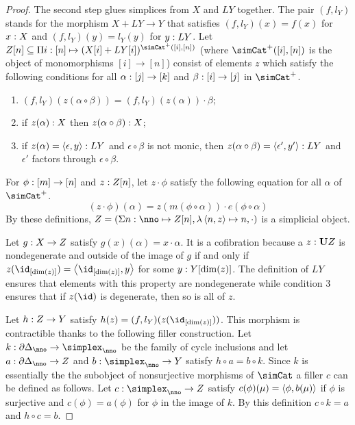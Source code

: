 \documentclass[csh.tex]{subfiles}
\begin{document}
\begin{proof}
The second step glues simplices from $X$ and $LY$ together.
The pair $(f,l_Y)$ stands for the morphism $X+LY\to Y$ that satisfies $(f,l_Y)(x)=f(x)$ for $x: X$ and $(f,l_Y)(y) = l_Y(y)$ for $y: LY$.
Let $Z[n]\subseteq \product{i\of[n]}{(X[i]+LY[i])^{\simCat^+([i],[n])}}$ (where $\simCat^+([i],[n])$ is the object of monomorphisms $[i]\to [n]$) consist of elements $z$ which satisfy the following conditions for all $\alpha: [j]\to [k]$ and $\beta: [i]\to[j]$ in $\simCat^+$.
\begin{enumerate}
\item $(f,l_Y)(z(\alpha\circ\beta)) = (f,l_Y)(z(\alpha))\cdot\beta$;
\item if $z(\alpha): X$ then $z(\alpha\circ\beta): X$;
\item if $z(\alpha)=\left\langle \epsilon,y \right\rangle: LY$ and $\epsilon\circ\beta$ is not monic, then $z(\alpha\circ\beta) = \left\langle \epsilon',y' \right\rangle: LY$ and $\epsilon'$ factors through $\epsilon\circ\beta$.
\end{enumerate}
For $\phi:[m]\to [n]$ and $z: Z[n]$, let $z\cdot\phi$ satisfy the following equation for all $\alpha$ of $\simCat^+$.
\[ (z\cdot\phi)(\alpha) = z(m(\phi\circ\alpha))\cdot e(\phi\circ \alpha) \]
By these definitions, $Z=(\coproduct{n\of\nno}{Z[n]},\function{\tuplet{n,z}}n,\cdot)$ is a simplicial object.

Let $g: X\to Z$ satisfy $g(x)(\alpha) = x\cdot\alpha$. It is a cofibration because a $z:\mathbf{U} Z$ is nondegenerate and outside of the image of $g$ if and only if $z(\id_{[\dim(z)]}) = \tuplet{\id_{[\dim(z)]},y}$ for some $y: Y[\dim(z)]$. The definition of $LY$ ensures that elements with this property are nondegenerate while condition 3 ensures that if $z(\id)$ is degenerate, then so is all of $z$.

Let $h: Z\to Y$ satisfy $h(z) = (f,l_Y)(z(\id_{[\dim(z)]}))$. This morphism is contractible thanks to the following filler construction.
Let $k\of\cycle_\nno\to\simplex_\nno$ be the family of cycle inclusions and let $a\of \cycle_\nno\to Z$ and $b\of \simplex_\nno\to Y$ satisfy $h\circ a = b\circ k$. Since $k$ is essentially the the subobject of nonsurjective morphisms of $\simCat$ a filler $c$ can be defined as follows.
Let $c\of \simplex_\nno\to Z$ satisfy $c(\phi)(\mu) = \left\langle \phi,b(\mu) \right\rangle$ if $\phi$ is surjective and $c(\phi) = a(\phi)$ for $\phi$ in the image of $k$. By this definition $c\circ k = a$ and $h\circ c = b$.\end{proof}
\end{document}
